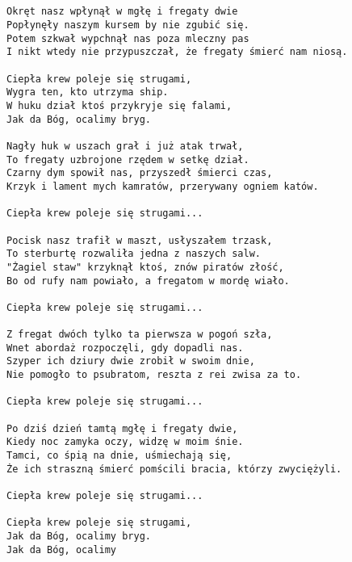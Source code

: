 \documentclass[12pt]{article}
\begin{document}
\subsection*{}
\begin{verbatim}
Okręt nasz wpłynął w mgłę i fregaty dwie
Popłynęły naszym kursem by nie zgubić się.
Potem szkwał wypchnął nas poza mleczny pas
I nikt wtedy nie przypuszczał, że fregaty śmierć nam niosą.

Ciepła krew poleje się strugami,
Wygra ten, kto utrzyma ship.
W huku dział ktoś przykryje się falami,
Jak da Bóg, ocalimy bryg.

Nagły huk w uszach grał i już atak trwał,
To fregaty uzbrojone rzędem w setkę dział.
Czarny dym spowił nas, przyszedł śmierci czas,
Krzyk i lament mych kamratów, przerywany ogniem katów.

Ciepła krew poleje się strugami...

Pocisk nasz trafił w maszt, usłyszałem trzask,
To sterburtę rozwaliła jedna z naszych salw.
"Żagiel staw" krzyknął ktoś, znów piratów złość,
Bo od rufy nam powiało, a fregatom w mordę wiało.

Ciepła krew poleje się strugami...

Z fregat dwóch tylko ta pierwsza w pogoń szła,
Wnet abordaż rozpoczęli, gdy dopadli nas.
Szyper ich dziury dwie zrobił w swoim dnie,
Nie pomogło to psubratom, reszta z rei zwisa za to.

Ciepła krew poleje się strugami...

Po dziś dzień tamtą mgłę i fregaty dwie,
Kiedy noc zamyka oczy, widzę w moim śnie.
Tamci, co śpią na dnie, uśmiechają się,
Że ich straszną śmierć pomścili bracia, którzy zwyciężyli.

Ciepła krew poleje się strugami...

Ciepła krew poleje się strugami,
Jak da Bóg, ocalimy bryg.
Jak da Bóg, ocalimy
\end{verbatim}
\clearpage
\end{document}
